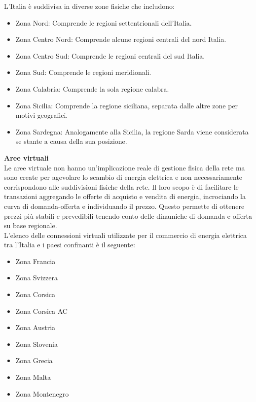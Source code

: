 \documentclass{article}
\begin{document}
L'Italia è suddivisa in diverse zone fisiche che includono\cite{A24_2021}:
\begin{itemize}
    \item Zona Nord: Comprende le regioni settentrionali dell'Italia.
    \item Zona Centro Nord: Comprende alcune regioni centrali del nord Italia.
    \item Zona Centro Sud: Comprende le regioni centrali del sud Italia.
    \item Zona Sud: Comprende le regioni meridionali.
    \item Zona Calabria: Comprende la sola regione calabra.
    \item Zona Sicilia: Comprende la regione siciliana, separata dalle altre zone per motivi geografici.
    \item Zona Sardegna: Analogamente alla Sicilia, la regione Sarda viene considerata se stante a causa della sua posizione.
\end{itemize}
\textbf{Aree virtuali}\\
Le aree virtuale non hanno un’implicazione reale di gestione fisica della rete ma sono create per agevolare lo scambio di energia elettrica e non necessariamente corrispondono alle suddivisioni fisiche della rete.  Il loro scopo è di facilitare le transazioni aggregando le offerte di acquisto e vendita di energia, incrociando la curva di domanda-offerta e individuando il prezzo. Questo permette di ottenere prezzi più stabili e prevedibili tenendo conto delle dinamiche di domanda e offerta su base regionale.\cite{Terna_sito}\\
L’elenco delle connessioni virtuali utilizzate per il commercio di energia elettrica tra l’Italia e i paesi confinanti è il seguente\cite{A24_2021}:
\begin{itemize}
    \item Zona Francia 
    \item Zona Svizzera 
    \item Zona Corsica 
    \item Zona Corsica AC 
    \item Zona Austria 
    \item Zona Slovenia 
    \item Zona Grecia 
    \item Zona Malta 
    \item Zona Montenegro 
\end{itemize}
\end{document}
